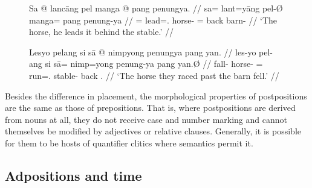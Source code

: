 \begin{figure}[h]
\pex
\a\label{ex:pangprep}\begingl
	\gla Sa @ lancāng pel manga @ pang penungya. //
	\glb sa= lant=yāng pel-Ø manga= pang penung-ya //
	\glc \PatT{}= lead=\TsgM{}.\Aarg{} horse-\Top{} \Dir{}= back 
		barn-\Loc{} //
	\glft `The horse, he leads it behind the stable.' //
\endgl

\a\label{ex:pangpost}\begingl
	\gla Lesyo pelang si sā @ nimpyong penungya pang yan. //
	\glb les-yo pel-ang si sā= nimp=yong penung-ya pang yan.Ø //
	\glc fall-\TsgN{} horse-\Aarg{} \Rel{} \CauT{}= 
		run=\TsgN{}.\Aarg{} stable-\Loc{} back \Tpl{}.\Top{} //
	\glft `The horse they raced past the barn fell.' //
\endgl
\xe
\end{figure}



Besides the difference in placement, the morphological properties of 
postpositions are the same as those of prepositions. That is, where 
postpositions are derived from nouns at all, they do not receive case and 
number marking and cannot themselves be modified by adjectives or relative 
clauses. Generally, it is possible for them to be hosts of quantifier clitics 
where semantics permit it.


\subsection{Adpositions and time}

